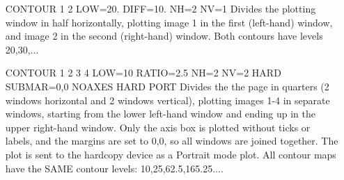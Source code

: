 \begin{itemize}
  \item[CONTOUR 1 2 LOW=20. DIFF=10. NH=2 NV=1\hfill]{
Divides the plotting window in half horizontally, plotting image
        1 in the first (left-hand) window, and image 2 in the second 
        (right-hand) window.  Both contours have levels 20,30,...}
  \item[CONTOUR 1 2 3 4 LOW=10 RATIO=2.5 NH=2 NV=2 HARD SUBMAR=0,0 NOAXES HARD PORT\hfill]{
Divides the the page in quarters (2 windows horizontal and 2 windows
        vertical), plotting images 1-4 in separate windows, starting from
        the lower left-hand window and ending up in the upper right-hand
        window.  Only the axis box is plotted without ticks or labels, and
        the margins are set to 0,0, so all windows are joined together.
        The plot is sent to the hardcopy device as a Portrait mode plot.
All contour maps have the SAME contour levels: 10,25,62.5,165.25....}
\end{itemize}


